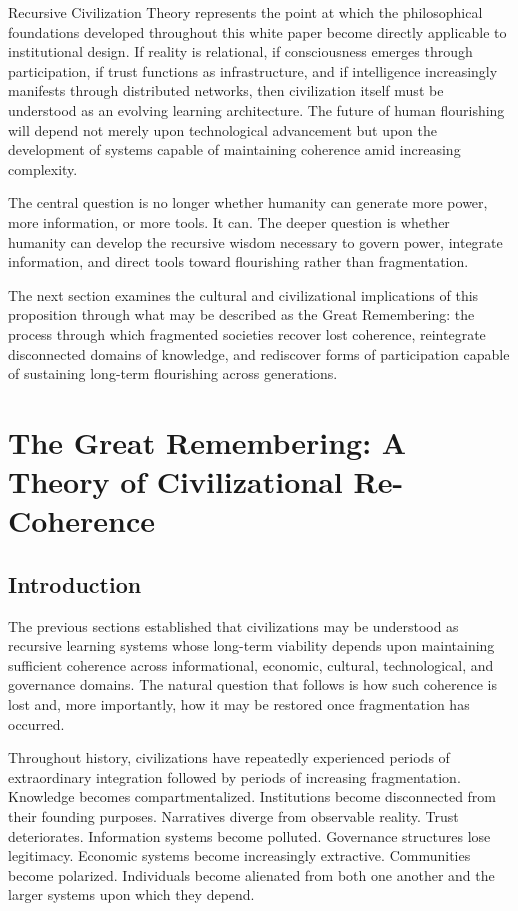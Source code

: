 \documentclass[12pt]{article}
\begin{document}
Recursive Civilization Theory represents the point at which the philosophical foundations developed throughout this white paper become directly applicable to institutional design. If reality is relational, if consciousness emerges through participation, if trust functions as infrastructure, and if intelligence increasingly manifests through distributed networks, then civilization itself must be understood as an evolving learning architecture. The future of human flourishing will depend not merely upon technological advancement but upon the development of systems capable of maintaining coherence amid increasing complexity.

The central question is no longer whether humanity can generate more power, more information, or more tools. It can. The deeper question is whether humanity can develop the recursive wisdom necessary to govern power, integrate information, and direct tools toward flourishing rather than fragmentation.

The next section examines the cultural and civilizational implications of this proposition through what may be described as the Great Remembering: the process through which fragmented societies recover lost coherence, reintegrate disconnected domains of knowledge, and rediscover forms of participation capable of sustaining long-term flourishing across generations.

\section{The Great Remembering: A Theory of Civilizational Re-Coherence}

\subsection{Introduction}

The previous sections established that civilizations may be understood as recursive learning systems whose long-term viability depends upon maintaining sufficient coherence across informational, economic, cultural, technological, and governance domains. The natural question that follows is how such coherence is lost and, more importantly, how it may be restored once fragmentation has occurred.

Throughout history, civilizations have repeatedly experienced periods of extraordinary integration followed by periods of increasing fragmentation. Knowledge becomes compartmentalized. Institutions become disconnected from their founding purposes. Narratives diverge from observable reality. Trust deteriorates. Information systems become polluted. Governance structures lose legitimacy. Economic systems become increasingly extractive. Communities become polarized. Individuals become alienated from both one another and the larger systems upon which they depend.
\end{document}
